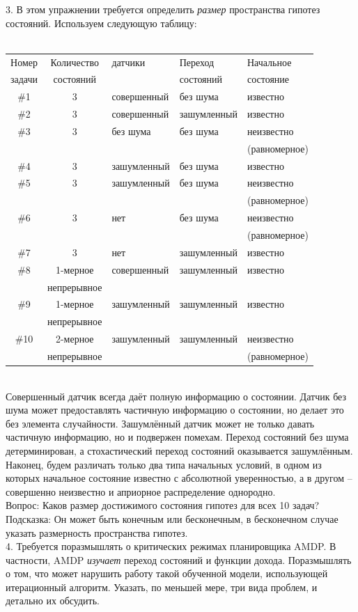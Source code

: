 \documentclass[10pt,a4paper]{article}
\begin{document}
3.	В этом упражнении требуется определить \textit{размер} пространства гипотез состояний. Используем следующую таблицу:\\
{}\\
\begin{tabular}{c|c|l|l|l}
Номер &Количество &датчики&Переход&Начальное   \\
задачи&состояний&{}&состояний&состояние\\
\hline
\#1&3&совершенный&без шума&известно\\ \hline
\#2&3&совершенный&зашумленный&известно\\
\hline
\#3&3&без шума&без шума&неизвестно\\
{}&{}&{}&{}& (равномерное)\\
\hline
\#4&3&зашумленный&без шума&известно\\
\hline
\#5&3&зашумленный&без шума&неизвестно\\
{}&{}&{}&{}& (равномерное)\\
\hline
\#6&3&нет&без шума&неизвестно\\
{}&{}&{}&{}& (равномерное)\\
\hline
\#7&3&нет&зашумленный&известно\\
\hline
\#8&1-мерное &совершенный&зашумленный&известно\\
{}&непрерывное&{}&{}& {}\\
\hline
\#9&1-мерное &зашумленный&зашумленный&известно\\
{}&непрерывное&{}&{}& {}\\
\hline
\#10&2-мерное &зашумленный&зашумленный&неизвестно\\
{}&непрерывное&{}&{}& (равномерное)\\
\hline
\end{tabular}\\

Совершенный датчик всегда даёт полную информацию о состоянии. Датчик без шума может предоставлять частичную информацию о состоянии, но делает это без элемента случайности. Зашумлённый датчик может не только давать частичную информацию, но и подвержен помехам. Переход состояний без шума детерминирован, а стохастический переход состояний оказывается зашумлённым. Наконец, будем различать только два типа начальных условий, в одном из которых начальное состояние известно с абсолютной уверенностью, а в другом – совершенно неизвестно и априорное распределение однородно.\\

Вопрос: Каков размер достижимого состояния гипотез для всех 10 задач?\\ Подсказка: Он может быть конечным или бесконечным, в бесконечном случае указать размерность пространства гипотез.\\

4.	Требуется поразмышлять о критических режимах планировщика AMDP. В частности, AMDP \textit{изучает} переход состояний и функции дохода. Поразмышлять о том, что может нарушить работу такой обученной модели, использующей итерационный алгоритм. Указать, по меньшей мере, три вида проблем, и детально их обсудить.\\

 
\end{document}
